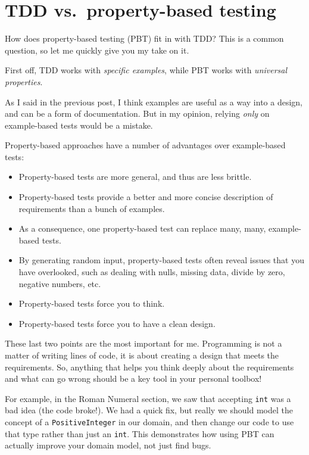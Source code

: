 \section{TDD vs.~property-based
testing}\label{tdd-vs.property-based-testing}

How does property-based testing (PBT) fit in with TDD? This is a common
question, so let me quickly give you my take on it.

First off, TDD works with \emph{specific examples}, while PBT works with
\emph{universal properties}.

As I said in the previous post, I think examples are useful as a way
into a design, and can be a form of documentation. But in my opinion,
relying \emph{only} on example-based tests would be a mistake.

Property-based approaches have a number of advantages over example-based
tests:

\begin{itemize}
\item
  Property-based tests are more general, and thus are less brittle.
\item
  Property-based tests provide a better and more concise description of
  requirements than a bunch of examples.
\item
  As a consequence, one property-based test can replace many, many,
  example-based tests.
\item
  By generating random input, property-based tests often reveal issues
  that you have overlooked, such as dealing with nulls, missing data,
  divide by zero, negative numbers, etc.
\item
  Property-based tests force you to think.
\item
  Property-based tests force you to have a clean design.
\end{itemize}

These last two points are the most important for me. Programming is not
a matter of writing lines of code, it is about creating a design that
meets the requirements.
So, anything that helps you think deeply about the requirements and what
can go wrong should be a key tool in your personal toolbox!

For example, in the Roman Numeral section, we saw that accepting
\texttt{int} was a bad idea (the code broke!). We had a quick fix, but
really we should model the concept of a \texttt{PositiveInteger} in our
domain, and then change our code to use that type rather than just an
\texttt{int}. This demonstrates how using PBT can actually improve your
domain model, not just find bugs.

